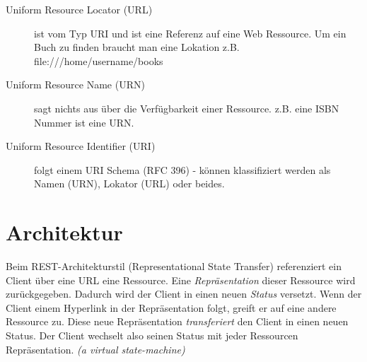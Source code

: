 \begin{description}
	\item[Uniform Resource Locator (URL)] ist vom Typ URI und ist eine Referenz auf eine Web Ressource. Um ein Buch zu finden braucht man eine Lokation z.B. file:///home/username/books
	\item[Uniform Resource Name (URN)] sagt nichts aus über die Verfügbarkeit einer Ressource. z.B. eine ISBN Nummer ist eine URN.
	\item[Uniform Resource Identifier (URI)] folgt einem URI Schema (RFC 396) - können klassifiziert werden als Namen (URN), Lokator (URL) oder beides.
\end{description}

\section{Architektur}

Beim REST-Architekturstil (Representational State Transfer) referenziert ein Client über eine URL eine Ressource. Eine \textit{Repräsentation} dieser Ressource wird zurückgegeben. Dadurch wird der Client in einen neuen \textit{Status} versetzt. Wenn der Client einem Hyperlink in der Repräsentation folgt, greift er auf eine andere Ressource zu. Diese neue Repräsentation \textit{transferiert} den Client in einen neuen Status. Der Client wechselt also seinen Status mit jeder Ressourcen Repräsentation. \emph{(a virtual state-machine)}

